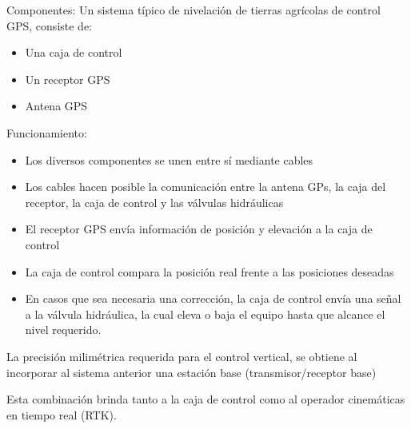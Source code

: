 Componentes: Un sistema típico de nivelación de tierras agrícolas de control GPS, consiste de:
\begin{itemize}
    \item Una caja de control
    \item Un receptor GPS
    \item Antena GPS
\end{itemize}
Funcionamiento:
\begin{itemize}
    \item Los diversos componentes se unen entre sí mediante cables
    \item Los cables hacen posible la comunicación entre la antena GPs, la caja del receptor, la caja de control y las válvulas hidráulicas
    \item El receptor GPS envía información de posición y elevación a la caja de control
    \item La caja de control compara la posición real frente a las posiciones deseadas
    \item En casos que sea necesaria una corrección, la caja de control envía una señal a la válvula hidráulica, la cual eleva o baja el equipo hasta que alcance el nivel requerido.
\end{itemize}

La precisión milimétrica requerida para el control vertical, se obtiene al incorporar al sistema anterior una estación base (transmisor/receptor base)

Esta combinación brinda tanto a la caja de control como al operador cinemáticas en tiempo real (RTK).


